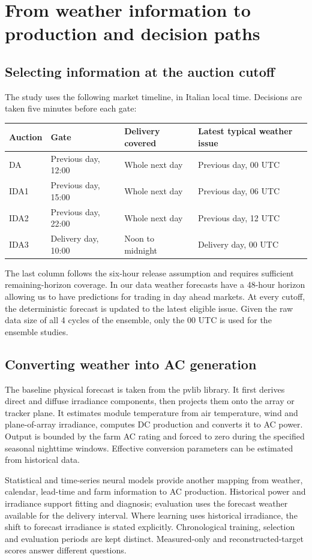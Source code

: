 \documentclass[11pt,a4paper]{article}
\begin{document}
\section{From weather information to production and decision paths}
\subsection{Selecting information at the auction cutoff}
The study uses the following market timeline, in Italian local time. Decisions
are taken five minutes before each gate:
\begin{center}\small
\begin{tabular}{llll}
\toprule Auction & Gate & Delivery covered & Latest typical weather issue\\\midrule
DA & Previous day, 12:00 & Whole next day & Previous day, 00 UTC\\
IDA1 & Previous day, 15:00 & Whole next day & Previous day, 06 UTC\\
IDA2 & Previous day, 22:00 & Whole next day & Previous day, 12 UTC\\
IDA3 & Delivery day, 10:00 & Noon to midnight & Delivery day, 00 UTC\\
\bottomrule\end{tabular}\end{center}
The last column follows the six-hour release assumption and requires sufficient
remaining-horizon coverage. In our data weather forecasts have a 48-hour horizon allowing us
to have predictions for trading in day ahead markets.
 At every cutoff, the deterministic forecast is
updated to the latest eligible issue. Given the raw data size of all 4 cycles of the ensemble,
only the 00 UTC is used for the ensemble studies.

\subsection{Converting weather into AC generation}
The baseline physical forecast is taken from the pvlib library. It first derives direct and diffuse irradiance components,
then projects them onto the array or tracker plane. It estimates module
temperature from air temperature, wind and plane-of-array irradiance, computes
DC production and converts it to AC power. Output is bounded by the farm AC
rating and forced to zero during the specified seasonal nighttime windows.
Effective conversion parameters can be estimated from historical data.

Statistical and time-series neural models provide another mapping from weather, calendar,
lead-time and farm information to AC production. Historical power and irradiance
support fitting and diagnosis; evaluation uses the forecast weather available
for the delivery interval. Where learning uses historical irradiance, the shift
to forecast irradiance is stated explicitly. Chronological training, selection
and evaluation periods are kept distinct. Measured-only and reconstructed-target
scores answer different questions.
\end{document}

